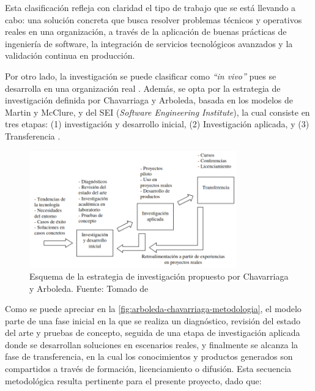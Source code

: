 Esta clasificación refleja con claridad el tipo de trabajo que se está llevando a cabo: una solución concreta que busca resolver problemas técnicos y operativos reales en una organización, a través de la aplicación de buenas prácticas de ingeniería de software, la integración de servicios tecnológicos avanzados y la validación continua en producción.

Por otro lado, la investigación se puede clasificar como \textit{``in vivo''} pues se desarrolla en una organización real \cite{ChavarriagaLIDIS}. Además, se opta por la estrategia de investigación definida por Chavarriaga y Arboleda, basada en los modelos de Martin y McClure, y del SEI (\textit{Software Engineering Institute}), la cual consiste en tres etapas: (1) investigación y desarrollo inicial, (2) Investigación aplicada, y (3) Transferencia \cite{ChavarriagaLIDIS,ChavarriagaModelo}.

\newcommand\arboledaChavarriagaMetodologiaCaption{Esquema de la estrategia de investigación propuesto por Chavarriaga y Arboleda. \hspace{1em}}
\begin{figure}[H]
  \centering
  \includegraphics[width=0.8\textwidth]{img/figures/fig9-chavarriaga-arboleda.png}
  \caption[\arboledaChavarriagaMetodologiaCaption]{\arboledaChavarriagaMetodologiaCaption Fuente: Tomado de \cite{ChavarriagaLIDIS}}
  \label{fig:arboleda-chavarriaga-metodologia}
\end{figure}

Como se puede apreciar en la \autoref{fig:arboleda-chavarriaga-metodologia}, el modelo parte de una fase inicial en la que se realiza un diagnóstico, revisión del estado del arte y pruebas de concepto, seguida de una etapa de investigación aplicada donde se desarrollan soluciones en escenarios reales, y finalmente se alcanza la fase de transferencia, en la cual los conocimientos y productos generados son compartidos a través de formación, licenciamiento o difusión. Esta secuencia metodológica resulta pertinente para el presente proyecto, dado que:

